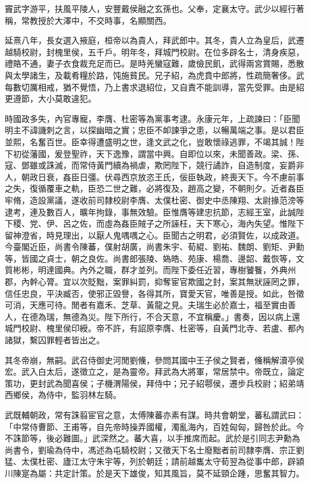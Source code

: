 
\begin{pinyinscope}
竇武字游平，扶風平陵人，安豐戴侯融之玄孫也。父奉，定襄太守。武少以經行著稱，常教授於大澤中，不交時事，名顯關西。

延熹八年，長女選入掖庭，桓帝以為貴人，拜武郎中。其冬，貴人立為皇后，武遷越騎校尉，封槐里侯，五千戶。明年冬，拜城門校尉。在位多辟名士，清身疾惡，禮賂不通，妻子衣食裁充足而已。是時羌蠻寇難，歲儉民飢，武得兩宮賞賜，悉散與太學諸生，及載肴糧於路，饨施貧民。兄子紹，為虎賁中郎將，性疏簡奢侈。武每數切厲相戒，猶不覺悟，乃上書求退紹位，又自責不能訓導，當先受罪。由是紹更遵節，大小莫敢違犯。

時國政多失，內官專寵，李膺、杜密等為黨事考逮。永康元年，上疏諫曰：「臣聞明主不諱譏刺之言，以探幽暗之實；忠臣不卹諫爭之患，以暢萬端之事。是以君臣並熙，名奮百世。臣幸得遭盛明之世，逢文武之化，豈敢懷祿逃罪，不竭其誠！陛下初從藩國，爰登聖祚，天下逸豫，謂當中興。自即位以來，未聞善政。梁、孫、寇、鄧雖或誅滅，而常侍黃門續為禍虐，欺罔陛下，競行譎詐，自造制度，妄爵非人，朝政日衰，姦臣日彊。伏尋西京放恣王氏，佞臣執政，終喪天下。今不慮前事之失，復循覆車之軌，臣恐二世之難，必將復及，趙高之變，不朝則夕。近者姦臣牢脩，造設黨議，遂收前司隸校尉李膺、太僕杜密、御史中丞陳翔、太尉掾范滂等逮考，連及數百人，曠年拘錄，事無效驗。臣惟膺等建忠抗節，志經王室，此誠陛下稷、党、伊、呂之佐，而虛為姦臣賊子之所誣枉，天下寒心，海內失望。惟陛下留神澄省，時見理出，以厭人鬼喁喁之心。臣聞古之明君，必須賢佐，以成政道。今臺閣近臣，尚書令陳蕃，僕射胡廣，尚書朱宇、荀緄、劉祐、魏朗、劉矩、尹勳等，皆國之貞士，朝之良佐。尚書郎張陵、媯皓、苑康、楊喬、邊韶、戴恢等，文質彬彬，明達國典。內外之職，群才並列。而陛下委任近習，專樹饕餮，外典州郡，內幹心膂。宜以次貶黜，案罪糾罰，抑奪宦官欺國之封，案其無狀誣罔之罪，信任忠良，平決臧否，使邪正毀譽，各得其所，寶愛天官，唯善是授。如此，咎徵可消，天應可待。閒者有嘉禾、芝草、黃龍之見。夫瑞生必於嘉士，福至實由善人，在德為瑞，無德為災。陛下所行，不合天意，不宜稱慶。」書奏，因以病上還城門校尉、槐里侯印綬。帝不許，有詔原李膺、杜密等，自黃門北寺、若盧、都內諸獄，繫囚罪輕者皆出之。

其冬帝崩，無嗣。武召侍御史河閒劉儵，參問其國中王子侯之賢者，儵稱解瀆亭侯宏。武入白太后，遂徵立之，是為靈帝。拜武為大將軍，常居禁中。帝既立，論定策功，更封武為聞喜侯；子機渭陽侯，拜侍中；兄子紹鄠侯，遷步兵校尉；紹弟靖西鄉侯，為侍中，監羽林左騎。

武既輔朝政，常有誅翦宦官之意，太傅陳蕃亦素有謀。時共會朝堂，蕃私謂武曰：「中常侍曹節、王甫等，自先帝時操弄國權，濁亂海內，百姓匈匈，歸咎於此。今不誅節等，後必難圖。」武深然之。蕃大喜，以手推席而起。武於是引同志尹勳為尚書令，劉瑜為侍中，馮述為屯騎校尉；又徵天下名士廢黜者前司隸李膺、宗正劉猛、太僕杜密、廬江太守朱宇等，列於朝廷；請前越巂太守荀翌為從事中郎，辟潁川陳寔為屬：共定計策。於是天下雄俊，知其風旨，莫不延頸企踵，思奮其智力。


\end{pinyinscope}
